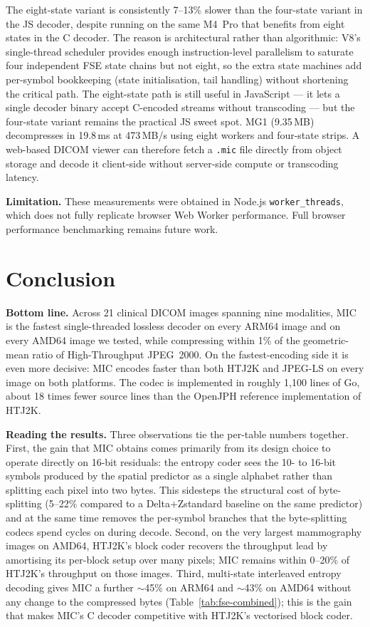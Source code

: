 \documentclass[journal]{IEEEtran}
\begin{document}
The eight-state variant is consistently 7--13\% slower than the
four-state variant in the JS decoder, despite running on the same M4~Pro
that benefits from eight states in the C decoder. The reason is
architectural rather than algorithmic: V8's single-thread scheduler
provides enough instruction-level parallelism to saturate four
independent FSE state chains but not eight, so the extra state machines
add per-symbol bookkeeping (state initialisation, tail handling) without
shortening the critical path. The eight-state path is still useful in
JavaScript --- it lets a single decoder binary accept C-encoded streams
without transcoding --- but the four-state variant remains the practical
JS sweet spot. MG1 (9.35\,MB) decompresses in 19.8\,ms at 473\,MB/s
using eight workers and four-state strips. A web-based DICOM viewer can
therefore fetch a \texttt{.mic} file directly from object storage and
decode it client-side without server-side compute or transcoding latency.

\textbf{Limitation.} These measurements were obtained in Node.js
\texttt{worker\_threads}, which does not fully replicate browser Web Worker
performance. Full browser performance benchmarking remains future work.

\section{Conclusion}
\label{sec:conclusion}

\textbf{Bottom line.} Across 21 clinical DICOM images spanning nine
modalities, MIC is the fastest single-threaded lossless decoder on every
ARM64 image and on every AMD64 image we tested, while compressing within 1\% of
the geometric-mean ratio of High-Throughput JPEG~2000. On the
fastest-encoding side it is even more decisive: MIC encodes faster than
both HTJ2K and JPEG-LS on every image on both platforms. The codec is
implemented in roughly 1,100 lines of Go, about 18 times fewer source
lines than the OpenJPH reference implementation of HTJ2K.

\textbf{Reading the results.} Three observations tie the per-table
numbers together. First, the gain that MIC obtains comes primarily from
its design choice to operate directly on 16-bit residuals: the entropy
coder sees the 10- to 16-bit symbols produced by the spatial predictor
as a single alphabet rather than splitting each pixel into two bytes.
This sidesteps the structural cost of byte-splitting (5--22\%
compared to a Delta+Zstandard baseline on the same predictor) and at
the same time removes the per-symbol branches that the byte-splitting
codecs spend cycles on during decode. Second, on the very largest
mammography images on AMD64, HTJ2K's block coder recovers the
throughput lead by amortising its per-block setup over many pixels;
MIC remains within 0--20\% of HTJ2K's throughput on those images. Third,
multi-state interleaved entropy decoding gives MIC a further ${\sim}$45\%
on ARM64 and ${\sim}$43\% on AMD64 without any change to the compressed
bytes (Table~\ref{tab:fse-combined}); this is the gain that makes MIC's
C decoder competitive with HTJ2K's vectorised block coder.
\end{document}
